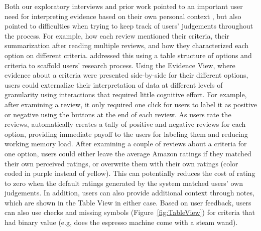 Both our exploratory interviews and prior work pointed to an important user need for interpreting evidence based on their own personal context \cite{shugan1980cost}, but also pointed to difficulties when trying to keep track of users’ judgements throughout the process. For example, how each review mentioned their criteria, their summarization after reading multiple reviews, and how they characterized each option on different criteria. \SYSTEM addressed this using a table structure of options and criteria to scaffold users’ research process. Using the Evidence View, where evidence about a criteria were presented side-by-side for their different options, users could externalize their interpretation of data at different levels of granularity using interactions that required little cognitive effort. For example, after examining a review, it only required one click for users to label it as positive or negative using the buttons at the end of each review. As users rate the reviews, \SYSTEM automatically creates a tally of positive and negative reviews for each option, providing immediate payoff to the users for labeling them and reducing working memory load. After examining a couple of reviews about a criteria for one option, users could either leave the average Amazon ratings if they matched their own perceived ratings, or overwrite them with their own ratings (color coded in purple instead of yellow). This can potentially reduces the cost of rating to zero when the default ratings generated by the system matched users’ own judgements. In addition, users can also provide additional context through notes, which are shown in the Table View in either case. Based on user feedback, users can also use checks and missing symbols (Figure~\ref{fig:TableView}) for criteria that had binary value (e.g, does the espresso machine come with a steam wand).

